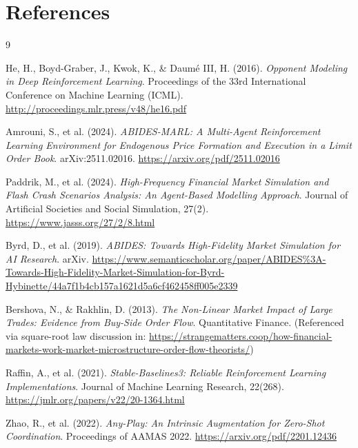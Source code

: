 \documentclass[8pt, a4paper]{article}
\begin{document}
{%
\section*{References}
\begingroup
\renewcommand{\section}[2]{}
\begin{thebibliography}{9}

He, H., Boyd-Graber, J., Kwok, K., \& Daum\'{e} III, H. (2016).
\textit{Opponent Modeling in Deep Reinforcement Learning}.
Proceedings of the 33rd International Conference on Machine Learning (ICML). \url{http://proceedings.mlr.press/v48/he16.pdf}

Amrouni, S., et al. (2024).
\textit{ABIDES-MARL: A Multi-Agent Reinforcement Learning Environment for Endogenous Price Formation and Execution in a Limit Order Book}.
arXiv:2511.02016. \url{https://arxiv.org/pdf/2511.02016}

Paddrik, M., et al. (2024).
\textit{High-Frequency Financial Market Simulation and Flash Crash Scenarios Analysis: An Agent-Based Modelling Approach}.
Journal of Artificial Societies and Social Simulation, 27(2). \url{https://www.jasss.org/27/2/8.html}

Byrd, D., et al. (2019).
\textit{ABIDES: Towards High-Fidelity Market Simulation for AI Research}.
arXiv. \url{https://www.semanticscholar.org/paper/ABIDES\%3A-Towards-High-Fidelity-Market-Simulation-for-Byrd-Hybinette/44a7f1b4cb157a1621d5a6cf462458ff005e2339}

Bershova, N., \& Rakhlin, D. (2013).
\textit{The Non-Linear Market Impact of Large Trades: Evidence from Buy-Side Order Flow}.
Quantitative Finance. (Referenced via square-root law discussion in: \url{https://strangematters.coop/how-financial-markets-work-market-microstructure-order-flow-theorists/})

Raffin, A., et al. (2021).
\textit{Stable-Baselines3: Reliable Reinforcement Learning Implementations}.
Journal of Machine Learning Research, 22(268). \url{https://jmlr.org/papers/v22/20-1364.html}

Zhao, R., et al. (2022).
\textit{Any-Play: An Intrinsic Augmentation for Zero-Shot Coordination}.
Proceedings of AAMAS 2022. \url{https://arxiv.org/pdf/2201.12436}


\end{thebibliography}}
\end{document}
